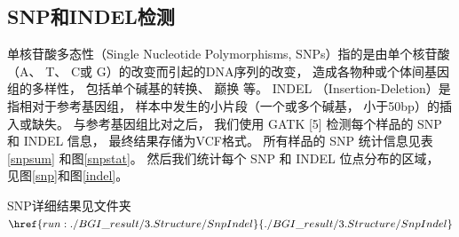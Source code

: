 \documentclass[10pt, oneside,a4paper]{article}
\begin{document}
\subsection{SNP和INDEL检测}
单核苷酸多态性（Single Nucleotide Polymorphisms, SNPs）指的是由单个核苷酸（A、 T、 C或
G）的改变而引起的DNA序列的改变， 造成各物种或个体间基因组的多样性， 包括单个碱基的转换、 巅换
等。 INDEL （Insertion-Deletion）是指相对于参考基因组， 样本中发生的小片段（一个或多个碱基，
小于50bp）的插入或缺失。 与参考基因组比对之后， 我们使用 GATK [5] 检测每个样品的 SNP 和 INDEL
信息， 最终结果存储为VCF格式。 所有样品的 SNP 统计信息见表\ref{snpsum} 和图\ref{snpstat}。
然后我们统计每个 SNP 和 INDEL 位点分布的区域， 见图\ref{snp}和图\ref{indel}。\par
SNP详细结果见文件夹$\href{run:./BGI\_result/3.Structure/SnpIndel}{./BGI\_result/3.Structure/SnpIndel}$\par
\end{document}
